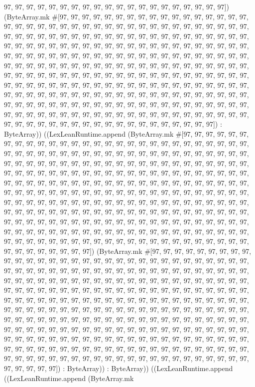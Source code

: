 \documentclass[11pt]{article}
\begin{document}
97, 97, 97, 97, 97, 97, 97, 97, 97, 97, 97, 97, 97, 97, 97, 97, 97, 97, 97, 97]) (ByteArray.mk \#[97, 97, 97, 97, 97, 97, 97, 97, 97, 97, 97, 97, 97, 97, 97, 97, 97, 97, 97, 97, 97, 97, 97, 97, 97, 97, 97, 97, 97, 97, 97, 97, 97, 97, 97, 97, 97, 97, 97, 97, 97, 97, 97, 97, 97, 97, 97, 97, 97, 97, 97, 97, 97, 97, 97, 97, 97, 97, 97, 97, 97, 97, 97, 97, 97, 97, 97, 97, 97, 97, 97, 97, 97, 97, 97, 97, 97, 97, 97, 97, 97, 97, 97, 97, 97, 97, 97, 97, 97, 97, 97, 97, 97, 97, 97, 97, 97, 97, 97, 97, 97, 97, 97, 97, 97, 97, 97, 97, 97, 97, 97, 97, 97, 97, 97, 97, 97, 97, 97, 97, 97, 97, 97, 97, 97, 97, 97, 97, 97, 97, 97, 97, 97, 97, 97, 97, 97, 97, 97, 97, 97, 97, 97, 97, 97, 97, 97, 97, 97, 97, 97, 97, 97, 97, 97, 97, 97, 97, 97, 97, 97, 97, 97, 97, 97, 97, 97, 97, 97, 97, 97, 97, 97, 97, 97, 97, 97, 97, 97, 97, 97, 97, 97, 97, 97, 97, 97, 97, 97, 97, 97, 97, 97, 97, 97, 97, 97, 97, 97, 97, 97, 97, 97, 97, 97, 97, 97, 97, 97, 97, 97, 97, 97, 97, 97, 97, 97, 97, 97, 97, 97, 97, 97, 97, 97, 97, 97, 97, 97, 97, 97, 97, 97, 97, 97, 97, 97, 97, 97, 97, 97, 97, 97, 97, 97, 97, 97, 97, 97, 97, 97, 97, 97, 97, 97, 97]) : ByteArray)) ((LexLeanRuntime.append (ByteArray.mk \#[97, 97, 97, 97, 97, 97, 97, 97, 97, 97, 97, 97, 97, 97, 97, 97, 97, 97, 97, 97, 97, 97, 97, 97, 97, 97, 97, 97, 97, 97, 97, 97, 97, 97, 97, 97, 97, 97, 97, 97, 97, 97, 97, 97, 97, 97, 97, 97, 97, 97, 97, 97, 97, 97, 97, 97, 97, 97, 97, 97, 97, 97, 97, 97, 97, 97, 97, 97, 97, 97, 97, 97, 97, 97, 97, 97, 97, 97, 97, 97, 97, 97, 97, 97, 97, 97, 97, 97, 97, 97, 97, 97, 97, 97, 97, 97, 97, 97, 97, 97, 97, 97, 97, 97, 97, 97, 97, 97, 97, 97, 97, 97, 97, 97, 97, 97, 97, 97, 97, 97, 97, 97, 97, 97, 97, 97, 97, 97, 97, 97, 97, 97, 97, 97, 97, 97, 97, 97, 97, 97, 97, 97, 97, 97, 97, 97, 97, 97, 97, 97, 97, 97, 97, 97, 97, 97, 97, 97, 97, 97, 97, 97, 97, 97, 97, 97, 97, 97, 97, 97, 97, 97, 97, 97, 97, 97, 97, 97, 97, 97, 97, 97, 97, 97, 97, 97, 97, 97, 97, 97, 97, 97, 97, 97, 97, 97, 97, 97, 97, 97, 97, 97, 97, 97, 97, 97, 97, 97, 97, 97, 97, 97, 97, 97, 97, 97, 97, 97, 97, 97, 97, 97, 97, 97, 97, 97, 97, 97, 97, 97, 97, 97, 97, 97, 97, 97, 97, 97, 97, 97, 97, 97, 97, 97, 97, 97, 97, 97, 97, 97, 97, 97, 97, 97, 97, 97]) (ByteArray.mk \#[97, 97, 97, 97, 97, 97, 97, 97, 97, 97, 97, 97, 97, 97, 97, 97, 97, 97, 97, 97, 97, 97, 97, 97, 97, 97, 97, 97, 97, 97, 97, 97, 97, 97, 97, 97, 97, 97, 97, 97, 97, 97, 97, 97, 97, 97, 97, 97, 97, 97, 97, 97, 97, 97, 97, 97, 97, 97, 97, 97, 97, 97, 97, 97, 97, 97, 97, 97, 97, 97, 97, 97, 97, 97, 97, 97, 97, 97, 97, 97, 97, 97, 97, 97, 97, 97, 97, 97, 97, 97, 97, 97, 97, 97, 97, 97, 97, 97, 97, 97, 97, 97, 97, 97, 97, 97, 97, 97, 97, 97, 97, 97, 97, 97, 97, 97, 97, 97, 97, 97, 97, 97, 97, 97, 97, 97, 97, 97, 97, 97, 97, 97, 97, 97, 97, 97, 97, 97, 97, 97, 97, 97, 97, 97, 97, 97, 97, 97, 97, 97, 97, 97, 97, 97, 97, 97, 97, 97, 97, 97, 97, 97, 97, 97, 97, 97, 97, 97, 97, 97, 97, 97, 97, 97, 97, 97, 97, 97, 97, 97, 97, 97, 97, 97, 97, 97, 97, 97, 97, 97, 97, 97, 97, 97, 97, 97, 97, 97, 97, 97, 97, 97, 97, 97, 97, 97, 97, 97, 97, 97, 97, 97, 97, 97, 97, 97, 97, 97, 97, 97, 97, 97, 97, 97, 97, 97, 97, 97, 97, 97, 97, 97, 97, 97, 97, 97, 97, 97, 97, 97, 97, 97, 97, 97, 97, 97, 97, 97, 97, 97, 97, 97, 97, 97, 97, 97]) : ByteArray)) : ByteArray)) ((LexLeanRuntime.append ((LexLeanRuntime.append (ByteArray.mk 
\end{document}
